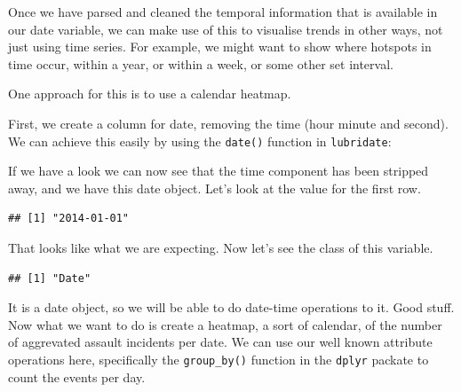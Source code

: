\documentclass[
]{book}
\makeatletter
\newenvironment{Shaded}{\begin{snugshade}}{\end{snugshade}}
\newcommand{\DecValTok}[1]{\textcolor[rgb]{0.06,0.06,0.06}{#1}}
\newcommand{\FunctionTok}[1]{\textcolor[rgb]{0,0,0}{#1}}
\newcommand{\NormalTok}[1]{#1}
\newcommand{\OtherTok}[1]{\textcolor[rgb]{0.37,0.37,0.37}{#1}}
\newcommand{\SpecialCharTok}[1]{\textcolor[rgb]{0,0,0}{#1}}
\newenvironment{kframe}{%
\medskip{}
\setlength{\fboxsep}{.8em}
 \def\at@end@of@kframe{}%
 \ifinner\ifhmode%
  \def\at@end@of@kframe{\end{minipage}}%
  \begin{minipage}{\columnwidth}%
 \fi\fi%
 \def\FrameCommand##1{\hskip\@totalleftmargin \hskip-\fboxsep
 \colorbox{shadecolor}{##1}\hskip-\fboxsep
     \hskip-\linewidth \hskip-\@totalleftmargin \hskip\columnwidth}%
 \MakeFramed {\advance\hsize-\width
   \@totalleftmargin\z@ \linewidth\hsize
   \@setminipage}}%
 {\par\unskip\endMakeFramed%
 \at@end@of@kframe}
\renewenvironment{Shaded}{\begin{kframe}}{\end{kframe}}
\makeatother
\begin{document}
Once we have parsed and cleaned the temporal information that is available in our date variable, we can make use of this to visualise trends in other ways, not just using time series. For example, we might want to show where hotspots in time occur, within a year, or within a week, or some other set interval.

One approach for this is to use a calendar heatmap.

First, we create a column for date, removing the time (hour minute and second). We can achieve this easily by using the \texttt{date()} function in \texttt{lubridate}:

\begin{Shaded}
\end{Shaded}

If we have a look we can now see that the time component has been stripped away, and we have this date object. Let's look at the value for the first row.

\begin{Shaded}
\end{Shaded}

\begin{verbatim}
## [1] "2014-01-01"
\end{verbatim}

That looks like what we are expecting. Now let's see the class of this variable.

\begin{Shaded}
\end{Shaded}

\begin{verbatim}
## [1] "Date"
\end{verbatim}

It is a date object, so we will be able to do date-time operations to it. Good stuff. Now what we want to do is create a heatmap, a sort of calendar, of the number of aggrevated assault incidents per date. We can use our well known attribute operations here, specifically the \texttt{group\_by()} function in the \texttt{dplyr} packate to count the events per day.
\end{document}
